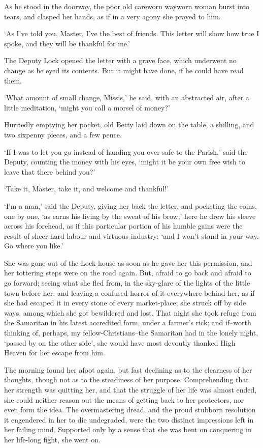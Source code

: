 As he stood in the doorway, the poor old careworn wayworn woman burst
into tears, and clasped her hands, as if in a very agony she prayed to
him.

‘As I’ve told you, Master, I’ve the best of friends. This letter will
show how true I spoke, and they will be thankful for me.’

The Deputy Lock opened the letter with a grave face, which underwent no
change as he eyed its contents. But it might have done, if he could have
read them.

‘What amount of small change, Missis,’ he said, with an abstracted air,
after a little meditation, ‘might you call a morsel of money?’

Hurriedly emptying her pocket, old Betty laid down on the table, a
shilling, and two sixpenny pieces, and a few pence.

‘If I was to let you go instead of handing you over safe to the Parish,’
said the Deputy, counting the money with his eyes, ‘might it be your own
free wish to leave that there behind you?’

‘Take it, Master, take it, and welcome and thankful!’

‘I’m a man,’ said the Deputy, giving her back the letter, and pocketing
the coins, one by one, ‘as earns his living by the sweat of his brow;’
here he drew his sleeve across his forehead, as if this particular
portion of his humble gains were the result of sheer hard labour and
virtuous industry; ‘and I won’t stand in your way. Go where you like.’

She was gone out of the Lock-house as soon as he gave her this
permission, and her tottering steps were on the road again. But, afraid
to go back and afraid to go forward; seeing what she fled from, in the
sky-glare of the lights of the little town before her, and leaving a
confused horror of it everywhere behind her, as if she had escaped it
in every stone of every market-place; she struck off by side ways, among
which she got bewildered and lost. That night she took refuge from the
Samaritan in his latest accredited form, under a farmer’s rick; and
if--worth thinking of, perhaps, my fellow-Christians--the Samaritan had
in the lonely night, ‘passed by on the other side’, she would have most
devoutly thanked High Heaven for her escape from him.

The morning found her afoot again, but fast declining as to the
clearness of her thoughts, though not as to the steadiness of her
purpose. Comprehending that her strength was quitting her, and that the
struggle of her life was almost ended, she could neither reason out the
means of getting back to her protectors, nor even form the idea. The
overmastering dread, and the proud stubborn resolution it engendered
in her to die undegraded, were the two distinct impressions left in her
failing mind. Supported only by a sense that she was bent on conquering
in her life-long fight, she went on.

